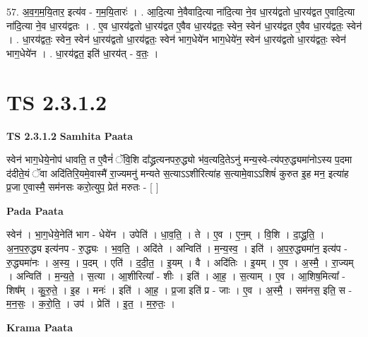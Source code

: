 \documentclass[17pt]{extarticle}
\begin{document}
57. अ॒व॒ग॒म॒यि॒तार॒ इत्य॑व - ग॒म॒यि॒तारः॑ । . आ॒दि॒त्या ने॒वैवादि॒त्या ना॑दि॒त्या ने॒व धा॒रय॑द्वतो धा॒रय॑द्वत ए॒वादि॒त्या ना॑दि॒त्या ने॒व धा॒रय॑द्वतः । . ए॒व धा॒रय॑द्वतो धा॒रय॑द्वत ए॒वैव धा॒रय॑द्वतः॒ स्वेन॒ स्वेन॑ धा॒रय॑द्वत ए॒वैव धा॒रय॑द्वतः॒ स्वेन॑ । . धा॒रय॑द्वतः॒ स्वेन॒ स्वेन॑ धा॒रय॑द्वतो धा॒रय॑द्वतः॒ स्वेन॑ भाग॒धेये॑न भाग॒धेये॑न॒ स्वेन॑ धा॒रय॑द्वतो धा॒रय॑द्वतः॒ स्वेन॑ भाग॒धेये॑न । . धा॒रय॑द्वत॒ इति॑ धा॒रय॑त् - व॒तः॒ । \newline
\pagebreak
{}

\section{ TS 2.3.1.2 }

\textbf{TS 2.3.1.2 } \newline
\textbf{Samhita Paata} \newline

स्वेन॑ भाग॒धेये॒नोप॑ धावति॒ त ए॒वैनं॑ ॅवि॒शि दा᳚द्ध्रत्यनपरु॒द्ध्यो भ॑व॒त्यदि॒तेऽनु॑ मन्य॒स्वे-त्य॑परु॒द्ध्यमा॑नोऽस्य प॒दमा द॑दीते॒यं ॅवा अदि॑तिरि॒यमे॒वास्मै॑ रा॒ज्यमनु॑ मन्यते स॒त्याऽऽशीरित्या॑ह स॒त्यामे॒वाऽऽशिषं॑ कुरुत इ॒ह मन॒ इत्या॑ह प्र॒जा ए॒वास्मै॒ सम॑नसः करो॒त्युप॒ प्रेत॑ मरुतः - [  ] \newline

\textbf{Pada Paata} \newline

स्वेन॑ । भा॒ग॒धेये॒नेति॑ भाग - धेये॑न । उपेति॑ । धा॒व॒ति॒ । ते । ए॒व । ए॒न॒म् । वि॒शि । दा॒द्ध्र॒ति॒ । अ॒न॒प॒रु॒द्ध्य इत्य॑नप - रु॒द्ध्यः । भ॒व॒ति॒ । अदि॑ते । अन्विति॑ । म॒न्य॒स्व॒ । इति॑ । अ॒प॒रु॒द्ध्यमा॑न॒ इत्य॑प - रु॒द्ध्यमा॑नः । अ॒स्य॒ । प॒दम् । एति॑ । द॒दी॒त॒ । इ॒यम् । वै । अदि॑तिः । इ॒यम् । ए॒व । अ॒स्मै॒ । रा॒ज्यम् । अन्विति॑ । म॒न्य॒ते॒ । स॒त्या । आ॒शीरित्या᳚ - शीः । इति॑ । आ॒ह॒ । स॒त्याम् । ए॒व । आ॒शिष॒मित्या᳚ - शिष᳚म् । कु॒रु॒ते॒ । इ॒ह । मनः॑ । इति॑ । आ॒ह॒ । प्र॒जा इति॑ प्र - जाः । ए॒व । अ॒स्मै॒ । सम॑नस॒ इति॒ स - म॒न॒सः॒ । क॒रो॒ति॒ । उप॑ । प्रेति॑ । इ॒त॒ । म॒रु॒तः॒ ।  \newline


\textbf{Krama Paata} \newline
\end{document}
